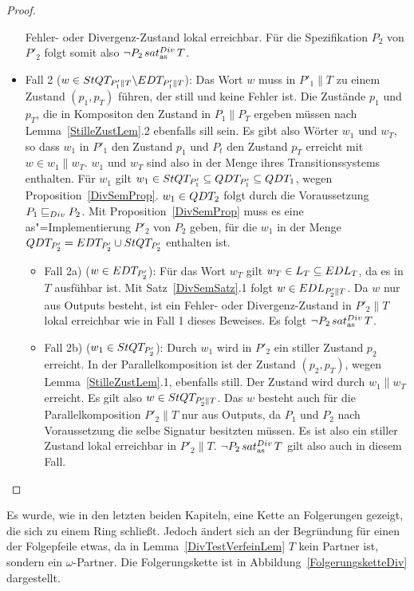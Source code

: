 \begin{proof}
\begin{itemize}
      Fehler- oder Divergenz-Zustand lokal erreichbar. Für die Spezifikation
      $P_2$ von $P'_2$ folgt somit also $\neg P_2\hspace{0.05cm}sat_\mathrm{as}^{Div}\hspace{0.05cm} T$.
    \item Fall 2 ($w\in StQT _{P'_1\|T} \backslash EDT _{P'_1\|T}$): Das Wort
      $w$ muss in $P'_1\|T$ zu einem Zustand $(p_1,p_T)$ führen, der still und
      keine Fehler ist. Die Zustände $p_1$ und $p_T$, die in Kompositon den
      Zustand in $P_1\|P_T$ ergeben müssen nach Lemma~\ref{StilleZustLem}.2
      ebenfalls sill sein. Es gibt also Wörter $w_1$ und $w_T$, so dass $w_1$
      in $P'_1$ den Zustand $p_1$ und $P_t$ den Zustand $p_T$ erreicht mit
      $w\in w_1\|w_T$. $w_1$ und $w_T$ sind also in der Menge \StQT{} ihres
      Transitionssystems enthalten. Für $w_1$ gilt $w_1\in StQT _{P'_1}
      \subseteq QDT _{P'_1}\subseteq QDT _1$, wegen
      Proposition~\ref{DivSemProp}. $w_1\in QDT _2$ folgt durch die
      Voraussetzung $P_1 \sqsubseteq  _{Div} P_2$. Mit Proposition~\ref{DivSemProp} muss es
      eine as"=Implementierung $P'_2$ von $P_2$ geben, für die $w_1$ in der
      Menge $QDT _{P'_2} = EDT _{P'_2} \cup StQT _{P'_2}$ enthalten ist.
      \begin{itemize}
        \item Fall 2a) ($w\in EDT _{P'_2}$): Für das Wort $w_T$ gilt $w_T\in L
          _T\subseteq EDL _T$, da es in $T$ ausfühbar ist. Mit
          Satz~\ref{DivSemSatz}.1 folgt $w\in EDL _{P'_2\|T}$. Da $w$ nur aus
          Outputs besteht, ist ein Fehler- oder Divergenz-Zustand in $P'_2\|T$
          lokal erreichbar wie in Fall 1 dieses Beweises. Es folgt $\neg P_2
          \hspace{0.05cm}sat_\mathrm{as}^{Div}\hspace{0.05cm} T$.
        \item Fall 2b) ($w_1\in StQT _{P'_2}$): Durch $w_1$ wird in $P'_2$ ein
          stiller Zustand $p_2$ erreicht. In der Parallelkomposition ist der
          Zustand $(p_2,p_T)$, wegen Lemma~\ref{StilleZustLem}.1, ebenfalls
          still. Der Zustand wird durch $w_1\|w_T$ erreicht. Es gilt also
          $w\in StQT _{P'_2\|T}$. Das $w$ besteht auch für die
          Parallelkomposition $P'_2\|T$ nur aus Outputs, da $P_1$ und $P_2$
          nach Voraussetzung die selbe Signatur besitzten müssen. Es ist also
          ein stiller Zustand lokal erreichbar in $P'_2\|T$. $\neg P_2\hspace{0.05cm}sat_\mathrm{as}^{Div}\hspace{0.05cm}
          T$ gilt also auch in diesem Fall.
      \end{itemize}
  \end{itemize}
\end{proof}

Es wurde, wie in den letzten beiden Kapiteln, eine Kette an Folgerungen
gezeigt, die sich zu einem Ring schließt. Jedoch ändert sich an der Begründung
für einen der Folgepfeile etwas, da in Lemma~\ref{DivTestVerfeinLem} $T$ kein
Partner ist, sondern ein $\omega$-Partner. Die Folgerungskette ist in
Abbildung~\ref{FolgerungsketteDiv} dargestellt.

